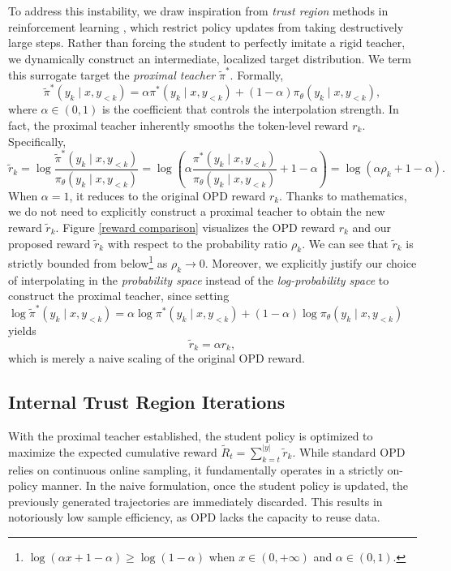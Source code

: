 \documentclass{article}
\theoremstyle{plain}
\theoremstyle{definition}
\theoremstyle{remark}
\begin{document}
To address this instability, we draw inspiration from \textit{trust region} methods in reinforcement learning \citep{schulman2015trust, schulman2017proximal, xie2025simple}, which restrict policy updates from taking destructively large steps. Rather than forcing the student to perfectly imitate a rigid teacher, we dynamically construct an intermediate, localized target distribution. We term this surrogate target the \textit{proximal teacher} $\tilde{\pi}^*$. Formally,
\begin{equation*}
	\tilde{\pi}^*(y_k\mid x,y_{<k})=\alpha\pi^*(y_k\mid x,y_{<k})+(1-\alpha)\pi_{\theta}(y_k\mid x,y_{<k}),
\end{equation*}
where $\alpha\in(0,1)$ is the coefficient that controls the interpolation strength. In fact, the proximal teacher inherently smooths the token-level reward $r_k$. Specifically,
\begin{equation}
	\tilde{r}_k=\log\frac{\tilde{\pi}^*(y_k\mid x,y_{<k})}{\pi_{\theta}(y_k\mid x,y_{<k})}=\log\left(\alpha\frac{\pi^*(y_k\mid x,y_{<k})}{\pi_{\theta}(y_k\mid x,y_{<k})}+1-\alpha\right)=\log\left(\alpha\rho_k+1-\alpha\right).
\end{equation}
When $\alpha=1$, it reduces to the original OPD reward $r_k$. Thanks to mathematics, we do not need to explicitly construct a proximal teacher to obtain the new reward $\tilde{r}_k$. Figure \ref{reward comparison} visualizes the OPD reward $r_k$ and our proposed reward $\tilde{r}_k$ with respect to the probability ratio $\rho_k$. We can see that $\tilde{r}_k$ is strictly bounded from below\footnote{$\log(\alpha x+1-\alpha)\geq\log(1-\alpha)$ when $x\in(0,+\infty)$ and $\alpha\in(0,1)$.} as $\rho_k\rightarrow0$. Moreover, we explicitly justify our choice of interpolating in the \textit{probability space} instead of the \textit{log-probability space} to construct the proximal teacher, since setting $\log\tilde{\pi}^*(y_k\mid x,y_{<k})=\alpha\log\pi^*(y_k\mid x,y_{<k})+(1-\alpha)\log\pi_{\theta}(y_k\mid x,y_{<k})$ yields
\begin{equation}
	\tilde{r}_k=\alpha r_k,
\end{equation}
which is merely a naive scaling of the original OPD reward.



\subsection{Internal Trust Region Iterations}\label{Internal Trust Region Iterations}
With the proximal teacher established, the student policy is optimized to maximize the expected cumulative reward $\tilde{R}_t=\sum_{k=t}^{\lvert y\rvert}\tilde{r}_k$. While standard OPD relies on continuous online sampling, it fundamentally operates in a strictly on-policy manner. In the naive formulation, once the student policy is updated, the previously generated trajectories are immediately discarded. This results in notoriously low sample efficiency, as OPD lacks the capacity to reuse data.
\end{document}
